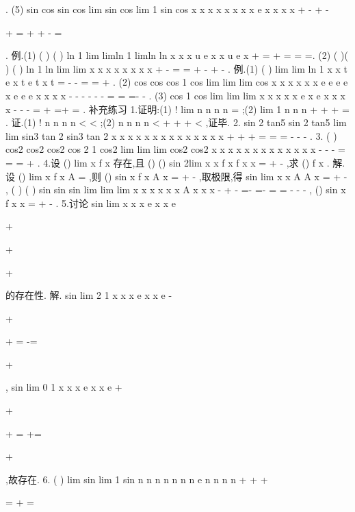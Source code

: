 . 
(5)
sin
cos
sin
cos
lim sin
cos
lim 1 sin
cos
x
x
x
x
x
x
x
x
e
x
x
x
x
+
-
\cdots 
+
-
\to \infty 
\to \infty 




+
=
+
+
-
=








. 
\textcolor{lyred}{例}.(1)
(
)
(
)
ln 1
lim
limln 1
limln
ln
x
x
x
u
e
x
x
u
e
x
\to 
\to 
\to 
+
=
+
=
=
=. 
(2)
(
)(
)
(
)
ln 1
ln
lim
lim
x
x
x
x
x
x
x
x
\to 
\to 
+
-
=
\cdots 
=
+
-
+
-
. 
\textcolor{lyred}{例}.(1)
(
)
lim
lim
ln 1
x
x
t e
x
t
e
t
x
t
=
-
\to 
\to 
-
=
=
+
. 
(2)
cos
cos
cos
1 cos
lim
lim
lim cos
x
x
x
x
x
x
e
e
e
e
x
e
e
e
x
x
x
x
-
-
\to 
\to 
\to 
-
-
-
-
=\cdots 
=\cdots 
\cdots 
=-
-
. 
(3)
cos
1 cos
lim
lim
lim
x
x
x
x
x
e
x
e
x
x
x
x
\to 
\to 
\to 
-
-
-
=
+
=+
=
. 
\textcolor{lyred}{补充练习 }
1.证明:(1)
!
lim
n
n
n
n
\to \infty 
=
;(2)
lim 1
n
n
n
\to \infty 
+
+
+
=
\Lambda 
. 
证.(1)
!
n
n
n
n
<
<
;(2)
n
n n
n
<
+
+
+
<
\Lambda 
,证毕. 
2.
sin 2
tan5
sin 2
tan5
lim
lim
sin3
tan 2
sin3
tan 2
x
x
x
x
x
x
x
x
x
x
x
x
x
x
\to 
\to 
+
+
+
=
=
=
-
-
-
. 
3.
(
)
cos2
cos2
cos2
cos 2
1 cos2
lim
lim
lim
cos2
cos2
x
x
x
x
x
x
x
x
x
x
x
x
x
\to 
\to 
\to 
-
-
-
=
=
=
+
. 
4.设
()
lim
x
f x
\pi 
\to 
存在,且
()
()
sin
2lim
x
x
f x
f x
x
\pi 
\pi 
\to 
=
+
-
,求
()
f x . 
解.设
()
lim
x
f x
A
\pi 
\to 
=
,则
()
sin
x
f
x
A
x
\pi 
=
+
-
,取极限,得
sin
lim
x
x
A
A
x
\pi 
\pi 
\to 
=
+
-
, 
(
)
(
)
sin
sin
sin
lim
lim
lim
x
x
x
x
x
x
A
x
x
x
\pi 
\pi 
\pi 
\pi 
\pi 
\pi 
\pi 
\pi 
\pi 
\to 
\to 
\to 
-
+
-
=-
=-
=
=
-
-
-
,
()
sin
x
f x
x
\pi 
=
+
-
. 
5.讨论
sin
lim
x
x
x
e
x
x
e
\to 


+


+




+


的存在性. 
解.
sin
lim
2 1
x
x
x
e
x
x
e
-
\to 


+


+
=
-=




+


,
sin
lim
0 1
x
x
x
e
x
x
e
+
\to 


+


+
=
+=




+


,故存在. 
6.
(
)
lim
sin
lim 1
sin
n
n
n
n
n
n
n
e
n
n
n
n
+
+
\to \infty 
\to \infty 
+


=
+
\cdots 
=




